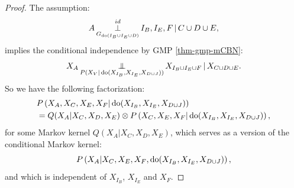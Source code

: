 \begin{proof}
The assumption:
            \[ A \operatorname*{\perp}^{id}_{G_{\operatorname{do}(I_B \cup I_E \cup D)}} I_B,I_E,F \operatorname*{|} C \cup D \cup E,   \]
implies the conditional independence by GMP \ref{thm-gmp-mCBN}:
\[ X_A \operatorname*{\perp\mkern-11mu\perp}_{P(X_V|\operatorname{do}(X_{I_B},X_{I_E},X_{D\cup J}))} X_{I_B\cup I_E \cup F} \operatorname*{|} X_{C \cup D \cup E}.\]
So we have the following factorization:
\begin{equation}\begin{split}\label{eq:all-do-int-1} 
  & P\left ( X_A,X_C,X_E,X_F|\operatorname{do}(X_{I_B},X_{I_E},X_{D\cup J})\right ) \\
  &= Q(X_A|X_C,X_D,X_E) \otimes P\left ( X_C,X_E,X_F|\operatorname{do}(X_{I_B},X_{I_E},X_{D\cup J})\right ),
\end{split}\end{equation}
for some Markov kernel $Q(X_A|X_C,X_D,X_E)$, which serves as a version of the conditional Markov kernel:
  \[P\left ( X_A|X_C,X_E,X_F,\operatorname{do}(X_{I_B},X_{I_E},X_{D\cup J})\right ),\]
and which is independent of $X_{I_B}$, $X_{I_E}$ and $X_F$.


\end{proof}
